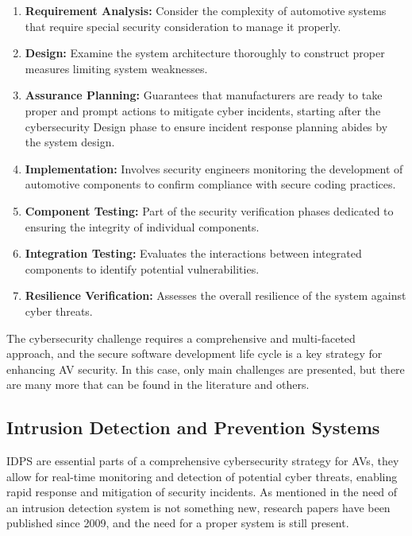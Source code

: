 \begin{enumerate}
    \item \textbf{Requirement Analysis:} Consider the complexity of automotive systems that require special security consideration to manage it properly.
    \item \textbf{Design:} Examine the system architecture thoroughly to construct proper measures limiting system weaknesses.
    \item \textbf{Assurance Planning:} Guarantees that manufacturers are ready to take proper and prompt actions to mitigate cyber incidents, starting after the cybersecurity Design phase to ensure incident response planning abides by the system design.
    \item \textbf{Implementation:} Involves security engineers monitoring the development of automotive components to confirm compliance with secure coding practices.
    \item \textbf{Component Testing:} Part of the security verification phases dedicated to ensuring the integrity of individual components.
    \item \textbf{Integration Testing:} Evaluates the interactions between integrated components to identify potential vulnerabilities.
    \item \textbf{Resilience Verification:} Assesses the overall resilience of the system against cyber threats.
\end{enumerate}

The cybersecurity challenge requires a comprehensive and multi-faceted approach, and the secure software development life cycle is a key strategy for enhancing AV security.
In this case, only main challenges are presented, but there are many more that can be found in the literature\cite{moukahal2021towards} and others.

\subsection{Intrusion Detection and Prevention Systems}\label{subsec:intrusion-detection-and-prevention-systems}
IDPS are essential parts of a comprehensive cybersecurity strategy for AVs, they allow for real-time monitoring and detection of potential cyber threats, enabling rapid response and mitigation of security incidents.
As mentioned in\cite{kim2020cybersecurity} the need of an intrusion detection system is not something new, research papers have been published since 2009, and the need for a proper system is still present.

